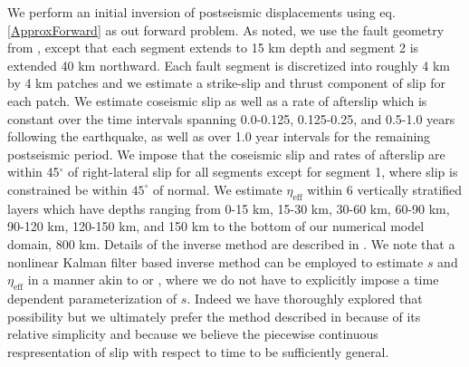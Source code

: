 \documentclass[12pt]{article}
\begin{document}
We perform an initial inversion of postseismic displacements using eq. \ref{ApproxForward} as out forward problem. As noted, we use the fault geometry from \cite{Wei2011}, except that each segment extends to 15 km depth and segment 2 is extended 40 km northward.  Each fault segment is discretized into roughly 4 km by 4 km patches and we estimate a strike-slip and thrust component of slip for each patch. We estimate coseismic slip as well as a rate of afterslip which is constant over the time intervals spanning 0.0-0.125, 0.125-0.25, and 0.5-1.0 years following the earthquake, as well as over 1.0 year intervals for the remaining postseismic period.  We impose that the coseismic slip and rates of afterslip are within 45$^\circ$ of right-lateral slip for all segments except for segment 1, where slip is constrained be within $45^\circ$ of normal.  We estimate $\eta_{\mathrm{eff}}$ within 6 vertically stratified layers which have depths ranging from 0-15 km, 15-30 km, 30-60 km, 60-90 km, 90-120 km, 120-150 km, and 150 km to the bottom of our numerical model domain, 800 km. Details of the inverse method are described in \cite{Hines2015}.  We note that a nonlinear Kalman filter based inverse method can be employed to estimate $s$ and $\eta_{\mathrm{eff}}$ in a manner akin to \cite{Segall1997} or \cite{McGuire2003}, where we do not have to explicitly impose a time dependent parameterization of $s$. Indeed we have thoroughly explored that possibility but we ultimately prefer the method described in \cite{Hines2015} because of its relative simplicity and because we believe the piecewise continuous respresentation of slip with respect to time to be sufficiently general.
\end{document}
